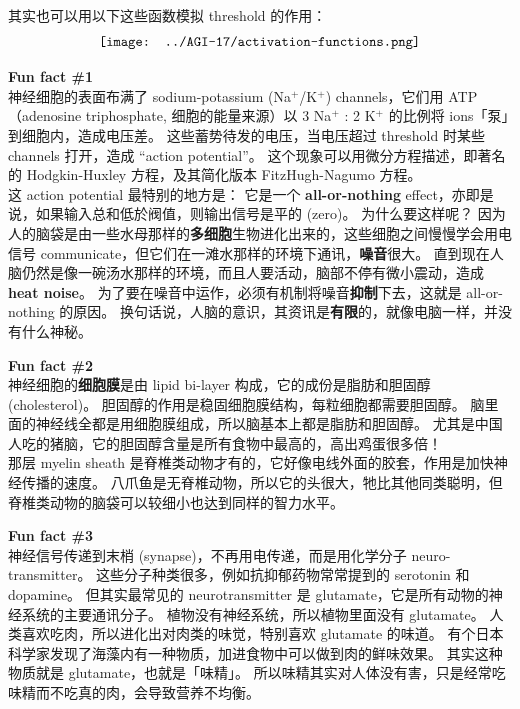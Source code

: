 \documentclass[orivec]{llncs}
\newcommand{\emp}[1]{{\color{blue}\textbf{#1}}}
\begin{document}
其实也可以用以下这些函数模拟 threshold 的作用：
\begin{equation}
\vcenter{\hbox{\texttt{[image: ../AGI-17/activation-functions.png]}}}
\end{equation}

\begin{tcolorbox}[colback=lightyellow, breakable, enhanced]
\emp{Fun fact \#1}\\

神经细胞的表面布满了 sodium-potassium (Na$^+$/K$^+$) channels，它们用 ATP （adenosine triphosphate, 细胞的能量来源）以 3 Na$^+$ : 2 K$^+$ 的比例将 ions「泵」到细胞内，造成电压差。 这些蓄势待发的电压，当电压超过 threshold 时某些 channels 打开，造成 ``action potential''。 这个现象可以用微分方程描述，即著名的 Hodgkin-Huxley 方程，及其简化版本 FitzHugh-Nagumo 方程。\\

这 action potential 最特别的地方是： 它是一个 \emp{all-or-nothing} effect，亦即是说，如果输入总和低於阀值，则输出信号是平的 (zero)。 为什么要这样呢？  因为人的脑袋是由一些水母那样的\emp{多细胞}生物进化出来的，这些细胞之间慢慢学会用电信号 communicate，但它们在一滩水那样的环境下通讯，\emp{噪音}很大。 直到现在人脑仍然是像一碗汤水那样的环境，而且人要活动，脑部不停有微小震动，造成\emp{heat noise}。 为了要在噪音中运作，必须有机制将噪音\emp{抑制}下去，这就是 all-or-nothing 的原因。 换句话说，人脑的意识，其资讯是\emp{有限}的，就像电脑一样，并没有什么神秘。
\end{tcolorbox}

\begin{tcolorbox}[colback=lightyellow, breakable, enhanced]
\emp{Fun fact \#2} \\

神经细胞的\emp{细胞膜}是由 lipid bi-layer 构成，它的成份是脂肪和胆固醇 (cholesterol)。 胆固醇的作用是稳固细胞膜结构，每粒细胞都需要胆固醇。 脑里面的神经线全都是用细胞膜组成，所以脑基本上都是脂肪和胆固醇。  尤其是中国人吃的猪脑，它的胆固醇含量是所有食物中最高的，高出鸡蛋很多倍！ \\

那层 myelin sheath 是脊椎类动物才有的，它好像电线外面的胶套，作用是加快神经传播的速度。 八爪鱼是无脊椎动物，所以它的头很大，牠比其他同类聪明，但脊椎类动物的脑袋可以较细小也达到同样的智力水平。
\end{tcolorbox}

\begin{tcolorbox}[colback=lightyellow, breakable, enhanced]
\emp{Fun fact \#3} \\

神经信号传递到末梢 (synapse)，不再用电传递，而是用化学分子 neuro-transmitter。 这些分子种类很多，例如抗抑郁药物常常提到的 serotonin 和 dopamine。 但其实最常见的 neurotransmitter 是 glutamate，它是所有动物的神经系统的主要通讯分子。 植物没有神经系统，所以植物里面没有 glutamate。 人类喜欢吃肉，所以进化出对肉类的味觉，特别喜欢 glutamate 的味道。 有个日本科学家发现了海藻内有一种物质，加进食物中可以做到肉的鲜味效果。  其实这种物质就是 glutamate，也就是「味精」。 所以味精其实对人体没有害，只是经常吃味精而不吃真的肉，会导致营养不均衡。 
\end{tcolorbox}
\end{document}

